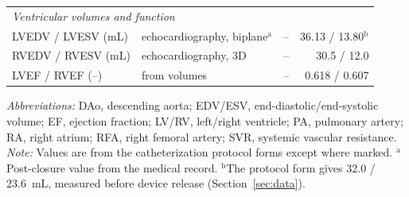 \begin{table}[!htbp]
{\begin{tabular}{llrr}
\midrule
\multicolumn{4}{l}{\emph{Ventricular volumes and function}} \\
LVEDV / LVESV (mL) & echocardiography, biplane$^{\mathrm{a}}$ & -- & 36.13 / 13.80$^{\mathrm{b}}$ \\
RVEDV / RVESV (mL) & echocardiography, 3D & -- & 30.5 / 12.0 \\
LVEF / RVEF (--) & from volumes & -- & 0.618 / 0.607 \\
\bottomrule
\end{tabular}}
\par\vspace{2pt}
\begin{minipage}{0.97\linewidth}
\raggedright\footnotesize
\emph{Abbreviations:} DAo, descending aorta; EDV/ESV, end-diastolic/end-systolic volume; EF, ejection fraction; LV/RV, left/right ventricle; PA, pulmonary artery; RA, right atrium; RFA, right femoral artery; SVR, systemic vascular resistance.\\
\emph{Note:} Values are from the catheterization protocol forms except where marked. $^{\mathrm{a}}$Post-closure value from the medical record. $^{\mathrm{b}}$The protocol form gives 32.0 / 23.6~mL, measured before device release (Section~\ref{sec:data}).
\end{minipage}
\end{table}

